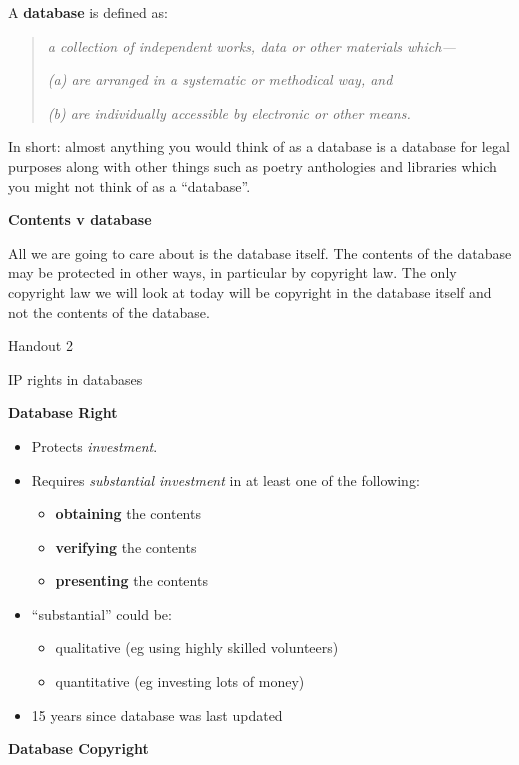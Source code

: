 A \textbf{database} is defined as:

\begin{quote}
\emph{a collection of independent works, data or other materials
which---}

\emph{(a) are arranged in a systematic or methodical way, and}

\emph{(b) are individually accessible by electronic or other means.}
\end{quote}

In short: almost anything you would think of as a database is a database
for legal purposes along with other things such as poetry anthologies
and libraries which you might not think of as a ``database''.

\textbf{Contents v database}

All we are going to care about is the database itself. The contents of
the database may be protected in other ways, in particular by copyright
law. The only copyright law we will look at today will be copyright in
the database itself and not the contents of the database.

Handout 2

IP rights in databases

\textbf{Database Right }

\begin{itemize}
\item
  Protects \emph{investment}.
\item
  Requires \emph{substantial investment} in at least one of the
  following:

  \begin{itemize}
  \item
    \textbf{obtaining} the contents
  \item
    \textbf{verifying} the contents
  \item
    \textbf{presenting} the contents
  \end{itemize}
\item
  ``substantial'' could be:

  \begin{itemize}
  \item
    qualitative (eg using highly skilled volunteers)
  \item
    quantitative (eg investing lots of money)
  \end{itemize}
\item
  15 years since database was last updated
\end{itemize}

\textbf{Database Copyright}

